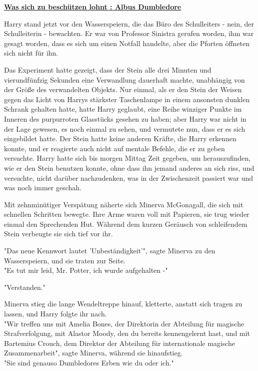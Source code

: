 

\hypertarget{was-sich-zu-beschuxfctzen-lohnt-albus-dumbledore}{%

\textbf{\uline{Was sich zu beschützen lohnt : Albus Dumbledore}}

Harry stand jetzt vor den Wasserspeiern, die das Büro des Schulleiters - nein, der Schulleiterin - bewachten. Er war von Professor Sinistra gerufen worden, ihm war gesagt worden, dass es sich um einen Notfall handelte, aber die Pforten öffneten sich nicht für ihn.

Das Experiment hatte gezeigt, dass der Stein alle drei Minuten und vierundfünfzig Sekunden eine Verwandlung dauerhaft machte, unabhängig von der Größe des verwandelten Objekts. Nur einmal, als er den Stein der Weisen gegen das Licht von Harrys stärkster Taschenlampe in einem ansonsten dunklen Schrank gehalten hatte, hatte Harry geglaubt, eine Reihe winziger Punkte im Inneren des purpurroten Glasstücks gesehen zu haben; aber Harry war nicht in der Lage gewesen, es noch einmal zu sehen, und vermutete nun, dass er es sich eingebildet hatte. Der Stein hatte keine anderen Kräfte, die Harry erkennen konnte, und er reagierte auch nicht auf mentale Befehle, die er zu geben versuchte. Harry hatte sich bis morgen Mittag Zeit gegeben, um herauszufinden, wie er den Stein benutzen konnte, ohne dass ihn jemand anderes an sich riss, und versuchte, nicht darüber nachzudenken, was in der Zwischenzeit passiert war und was noch immer geschah.

Mit zehnminütiger Verspätung näherte sich Minerva McGonagall, die sich mit schnellen Schritten bewegte. Ihre Arme waren voll mit Papieren, sie trug wieder einmal den Sprechenden Hut. Während dem kurzen Geräusch von schleifendem Stein verbeugte sie sich tief vor ihr.

"Das neue Kennwort lautet 'Unbeständigkeit'", sagte Minerva zu den Wasserspeiern, und sie traten zur Seite.\\ "Es tut mir leid, Mr. Potter, ich wurde aufgehalten -"

"Verstanden."

Minerva stieg die lange Wendeltreppe hinauf, kletterte, anstatt sich tragen zu lassen, und Harry folgte ihr nach.\\ "Wir treffen uns mit Amelia Bones, der Direktorin der Abteilung für magische Strafverfolgung, mit Alastor Moody, den du bereits kennengelernt hast, und mit Bartemius Crouch, dem Direktor der Abteilung für internationale magische Zusammenarbeit", sagte Minerva, während sie hinaufstieg.\\ "Sie sind genauso Dumbledores Erben wie du oder ich."

}
